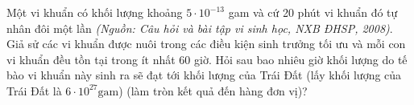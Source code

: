 \begin{bt} %
	Một vi khuẩn có khối lượng khoảng $5 \cdot 10^{-13}$ gam và cứ 20 phút vi khuẩn đó tự nhân đôi một lần \textit{(Nguồn: Câu hỏi và bài tập vi sinh học, NXB ĐHSP, 2008)}. Giả sử các vi khuẩn được nuôi trong các điều kiện sinh trưởng tối ưu và mỗi con vi khuẩn đều tồn tại trong ít nhất 60 giờ. Hỏi sau bao nhiêu giờ khối lượng do tế bào vi khuẩn này sinh ra sẽ đạt tới khối lượng của Trái Đất (lấy khối lượng của Trái Đất là $6 \cdot 10^{27} \mathrm{gam}$) (làm tròn kết quả đến hàng đơn vị)?
\end{bt}

